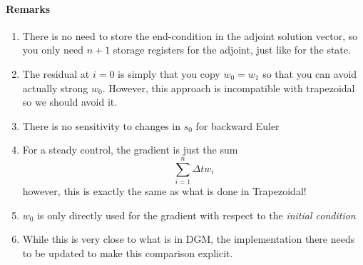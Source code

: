 \documentclass[10pt, oneside]{article}
\newcommand{\dgm}{\textsf{DGM}\xspace}
\begin{document}
\paragraph{Remarks}
\begin{enumerate}
\item There is no need to store the end-condition in the adjoint solution vector, so you only need $n+1$ storage registers for the adjoint, just like for the state.
\item The residual at $i=0$ is simply that you copy $w_0 = w_1$ so that you can avoid actually strong $w_0$.  However, this approach is incompatible with trapezoidal so we should avoid it.
\item There is no sensitivity to changes in $s_0$ for backward Euler
\item For a steady control, the gradient is just the sum
\[ \sum_{i=1}^n \Delta t w_i \]
however, this is exactly the same as what is done in Trapezoidal!
\item $w_0$ is only directly used for the gradient with respect to the \emph{initial condition}
\item While this is very close to what is in \dgm, the implementation there needs to be updated to make this comparison explicit.
\end{enumerate}
\end{document}
